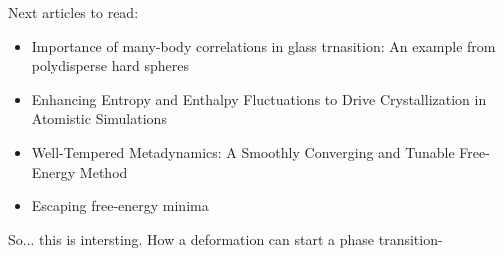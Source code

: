 \documentclass[a4paper, 11pt, oneside]{researchjournal} %
\begin{document}
Next articles to read:
\begin{itemize}
	\item Importance of many-body correlations in glass trnasition: An example from polydisperse hard spheres
	\item Enhancing Entropy and Enthalpy Fluctuations to Drive Crystallization in Atomistic Simulations
	\item Well-Tempered Metadynamics: A Smoothly Converging and Tunable Free-Energy Method
	\item Escaping free-energy minima
\end{itemize}


So... this is intersting. How a deformation can start a phase transition-



\end{document}
